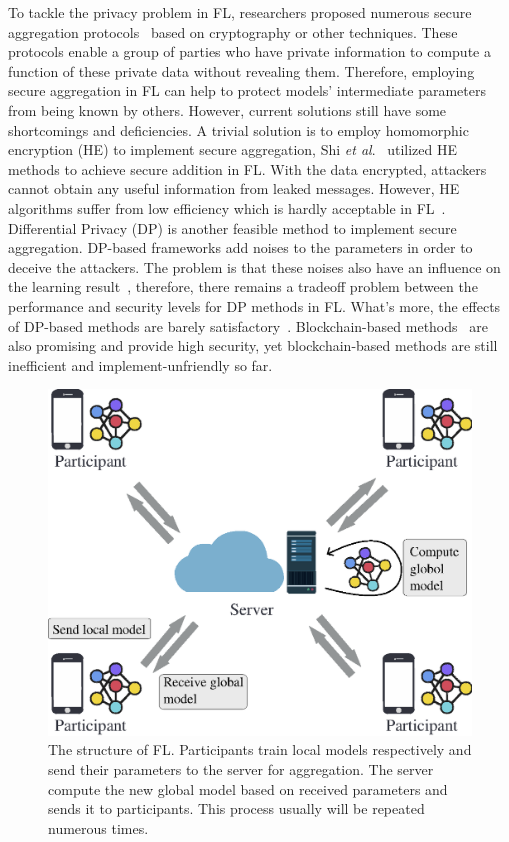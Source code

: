 To tackle the privacy problem in FL, researchers proposed numerous secure aggregation protocols~\cite{shi2011privacy,RobustAgg,Bonawitz19,Nike,PrivFL} based on cryptography or other techniques. These protocols enable a group of parties who have private information to compute a function of these private data without revealing them. Therefore, employing secure aggregation in FL can help to protect models' intermediate parameters from being known by others. However, current solutions still have some shortcomings and deficiencies. A trivial solution is to employ homomorphic encryption (HE) to implement secure aggregation, Shi \emph{et al}.~\cite{shi2011privacy} utilized HE methods to achieve secure addition in FL. With the data encrypted, attackers cannot obtain any useful information from leaked messages. However, HE algorithms suffer from low efficiency which is hardly acceptable in FL~\cite{HESurvey}. Differential Privacy (DP) is another feasible method to implement secure aggregation. DP-based frameworks add noises to the parameters in order to deceive the attackers. The problem is that these noises also have an influence on the learning result~\cite{DLwDP}, therefore, there remains a tradeoff problem between the performance and security levels for DP methods in FL. What's more, the effects of DP-based methods are barely satisfactory~\cite{Bargav19}. Blockchain-based methods~\cite{DeepChain,Lu2020,On-Device} are also promising and provide high security, yet blockchain-based methods are still inefficient and implement-unfriendly so far.

\begin{figure}[!ht]
    \centering
    \includegraphics[width=0.9\columnwidth]{img/fed.eps}
    \caption{The structure of FL. Participants train local models respectively and send their parameters to the server for aggregation. The server compute the new global model based on received parameters and sends it to participants. This process usually will be repeated numerous times.}
    \label{fed}
\end{figure}

